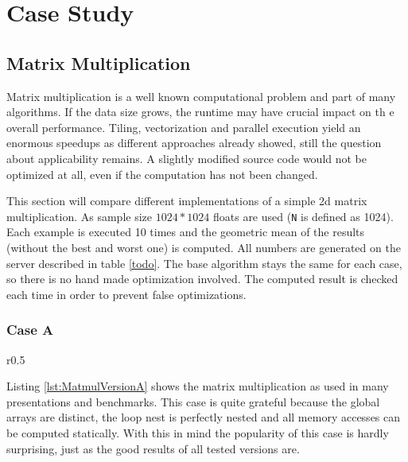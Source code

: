 
\chapter{Case Study} %
\label{Chapter6}


\section{Matrix Multiplication}
\label{MatrixMultiplication}
Matrix multiplication is a well known computational problem and part of many 
algorithms. If the data size grows, the runtime may have crucial impact on th
e overall performance. Tiling, vectorization and parallel execution yield an
enormous speedups as different approaches already
showed\cite{grosser:thesis, JIMBOREAN-2012-664345},
still the question about applicability remains. A slightly modified source code 
would not be optimized at all, even if the computation has not been changed. 

This section will compare different implementations of a simple 2d
matrix multiplication. As sample size  $1024*1024$ floats are used 
(\texttt{N} is defined as 1024).
Each example is executed 10 times and the geometric mean of the results 
(without the best and worst one) is computed. All numbers are generated on 
the server described in table \ref{todo}. The base algorithm stays the same 
for each case, so there is no hand made optimization involved. The computed 
result is checked each time in order to prevent false optimizations.


\subsection{Case A}
\begin{wrapfigure}[]{r}{0.5\textwidth}
  \centering
    \begin{minipage}[c]{0.4\textwidth}
    \vspace*{-3mm}
    
    \end{minipage}
  \caption{Matmul case A}
   \label{lst:MatmulVersionA}
\end{wrapfigure}

Listing \ref{lst:MatmulVersionA} shows the matrix multiplication as used in 
many presentations and benchmarks. This case is quite grateful because the
global arrays are distinct, the loop nest is perfectly nested and all 
memory accesses can be computed statically. With this in mind the popularity of
this case is hardly surprising, just as the good results of all tested versions 
are.  \\ 




